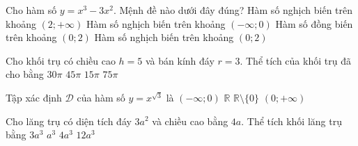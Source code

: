 \begin{ex}%
Cho hàm số $y=x^3-3x^2$. Mệnh đề nào dưới đây đúng?
\choice
{Hàm số nghịch biến trên khoảng $(2;+\infty)$}
{Hàm số nghịch biến trên khoảng $(-\infty ;0)$}
{Hàm số đồng biến trên khoảng $(0;2)$}
{\True Hàm số nghịch biến trên khoảng $(0;2)$}
\end{ex}



\begin{ex}%
Cho khối trụ có chiều cao $h=5$ và bán kính đáy $r=3$. Thể tích của khối trụ đã cho bằng
\choice
{$30\pi $}
{\True $45\pi $}
{$15\pi $}
{$75\pi $}
\end{ex}



\begin{ex}%
Tập xác định $\mathscr{D}$ của hàm số $y=x^{\sqrt{3}}$ là
\choice
{$(-\infty ;0)$}
{$\mathbb{R}$}
{$\mathbb{R} \setminus \{0\}$}
{\True $\left(0;+\infty\right)$}
\end{ex}



\begin{ex}%
Cho lăng trụ có diện tích đáy $3a^2$ và chiều cao bằng $4a$. Thể tích khối lăng trụ bằng
\choice
{$3a^3$}
{$a^3$}
{$4a^3$}
{\True $12a^3$}
\end{ex}



